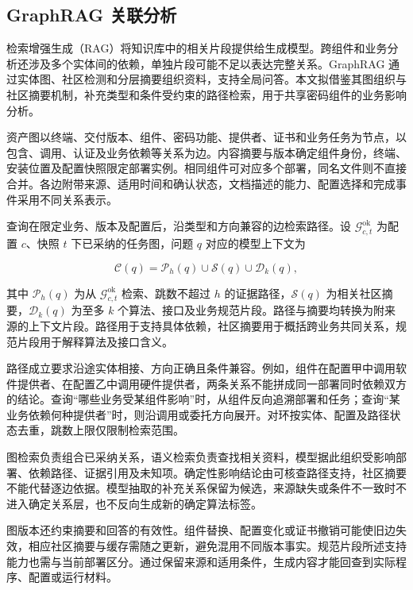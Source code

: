 \subsection{GraphRAG 关联分析}
\label{subsec:graphrag-principles}

检索增强生成（RAG）将知识库中的相关片段提供给生成模型\cite{rag2020}。跨组件和业务分析还涉及多个实体间的依赖，单独片段可能不足以表达完整关系。GraphRAG 通过实体图、社区检测和分层摘要组织资料，支持全局问答\cite{graphrag2024}。本文拟借鉴其图组织与社区摘要机制，补充类型和条件受约束的路径检索，用于共享密码组件的业务影响分析。

资产图以终端、交付版本、组件、密码功能、提供者、证书和业务任务为节点，以包含、调用、认证及业务依赖等关系为边。内容摘要与版本确定组件身份，终端、安装位置及配置快照限定部署实例。相同组件可对应多个部署，同名文件则不直接合并。各边附带来源、适用时间和确认状态，文档描述的能力、配置选择和完成事件采用不同关系表示。

查询在限定业务、版本及配置后，沿类型和方向兼容的边检索路径。设 $\mathcal G_{c,t}^{\mathrm{ok}}$ 为配置 $c$、快照 $t$ 下已采纳的任务图，问题 $q$ 对应的模型上下文为

\begin{equation}
  \mathcal C(q)=\mathcal P_h(q)\cup\mathcal S(q)\cup\mathcal D_k(q),
  \label{eq:graphrag-evidence-context}
\end{equation}

其中 $\mathcal P_h(q)$ 为从 $\mathcal G_{c,t}^{\mathrm{ok}}$ 检索、跳数不超过 $h$ 的证据路径，$\mathcal S(q)$ 为相关社区摘要，$\mathcal D_k(q)$ 为至多 $k$ 个算法、接口及业务规范片段。路径与摘要均转换为附来源的上下文片段。路径用于支持具体依赖，社区摘要用于概括跨业务共同关系，规范片段用于解释算法及接口含义。

路径成立要求沿途实体相接、方向正确且条件兼容。例如，组件在配置甲中调用软件提供者、在配置乙中调用硬件提供者，两条关系不能拼成同一部署同时依赖双方的结论。查询“哪些业务受某组件影响”时，从组件反向追溯部署和任务；查询“某业务依赖何种提供者”时，则沿调用或委托方向展开。对环按实体、配置及路径状态去重，跳数上限仅限制检索范围。

图检索负责组合已采纳关系，语义检索负责查找相关资料，模型据此组织受影响部署、依赖路径、证据引用及未知项。确定性影响结论由可核查路径支持，社区摘要不能代替逐边依据。模型抽取的补充关系保留为候选，来源缺失或条件不一致时不进入确定关系层，也不反向生成新的确定算法标签。

图版本还约束摘要和回答的有效性。组件替换、配置变化或证书撤销可能使旧边失效，相应社区摘要与缓存需随之更新，避免混用不同版本事实。规范片段所述支持能力也需与当前部署区分。通过保留来源和适用条件，生成内容才能回查到实际程序、配置或运行材料。

